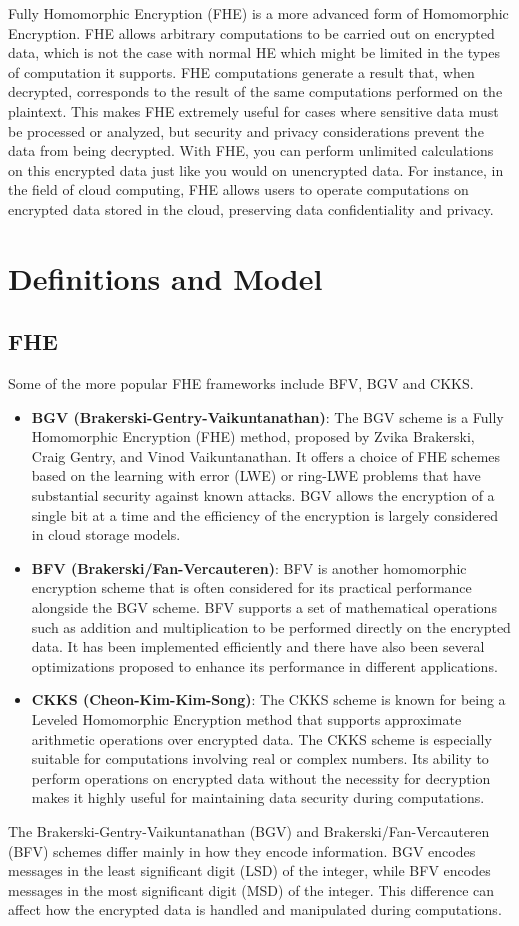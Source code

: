 \documentclass[11pt]{article}
\begin{document}
Fully Homomorphic Encryption (FHE) is a more advanced form of Homomorphic Encryption.
FHE allows arbitrary computations to be carried out on encrypted data, which is not the case with normal HE which might be limited in the types of computation it supports.
FHE computations generate a result that, when decrypted, corresponds to the result of the same computations performed on the plaintext.
This makes FHE extremely useful for cases where sensitive data must be processed or analyzed, but security and privacy considerations prevent the data from being decrypted.
With FHE, you can perform unlimited calculations on this encrypted data just like you would on unencrypted data. For instance, in the field of cloud computing, FHE allows users to operate computations on encrypted data stored in the cloud, preserving data confidentiality and privacy.

\section{Definitions and Model}
\subsection{FHE}
Some of the more popular FHE frameworks include BFV, BGV and CKKS.
\begin{itemize}
\item \textbf{BGV (Brakerski-Gentry-Vaikuntanathan)}: The BGV scheme is a Fully Homomorphic Encryption (FHE) method, proposed by Zvika Brakerski, Craig Gentry, and Vinod Vaikuntanathan.
It offers a choice of FHE schemes based on the learning with error (LWE) or ring-LWE problems that have substantial security against known attacks.
BGV allows the encryption of a single bit at a time and the efficiency of the encryption is largely considered in cloud storage models.
\item \textbf{BFV (Brakerski/Fan-Vercauteren)}: BFV is another homomorphic encryption scheme that is often considered for its practical performance alongside the BGV scheme.
BFV supports a set of mathematical operations such as addition and multiplication to be performed directly on the encrypted data.
It has been implemented efficiently and there have also been several optimizations proposed to enhance its performance in different applications.
\item \textbf{CKKS (Cheon-Kim-Kim-Song)}: The CKKS scheme is known for being a Leveled Homomorphic Encryption method that supports approximate arithmetic operations over encrypted data.
The CKKS scheme is especially suitable for computations involving real or complex numbers.
Its ability to perform operations on encrypted data without the necessity for decryption makes it highly useful for maintaining data security during computations.
\end{itemize}
The Brakerski-Gentry-Vaikuntanathan (BGV) and Brakerski/Fan-Vercauteren (BFV) schemes differ mainly in how they encode information.
BGV encodes messages in the least significant digit (LSD) of the integer, while BFV encodes messages in the most significant digit (MSD) of the integer.
This difference can affect how the encrypted data is handled and manipulated during computations.
\end{document}
